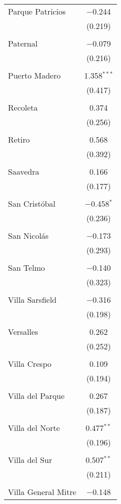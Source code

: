 \begin{table}[!htbp]
\begin{tabular}{@{\extracolsep{5pt}}lc}
 Parque Patricios & $-$0.244 \\ 
  & (0.219) \\ 
  & \\ 
 Paternal & $-$0.079 \\ 
  & (0.216) \\ 
  & \\ 
 Puerto Madero & 1.358$^{***}$ \\ 
  & (0.417) \\ 
  & \\ 
 Recoleta & 0.374 \\ 
  & (0.256) \\ 
  & \\ 
 Retiro & 0.568 \\ 
  & (0.392) \\ 
  & \\ 
 Saavedra & 0.166 \\ 
  & (0.177) \\ 
  & \\ 
 San Cristóbal & $-$0.458$^{*}$ \\ 
  & (0.236) \\ 
  & \\ 
 San Nicolás & $-$0.173 \\ 
  & (0.293) \\ 
  & \\ 
 San Telmo & $-$0.140 \\ 
  & (0.323) \\ 
  & \\ 
 Villa Sarsfield & $-$0.316 \\ 
  & (0.198) \\ 
  & \\ 
 Versalles & 0.262 \\ 
  & (0.252) \\ 
  & \\ 
 Villa Crespo & 0.109 \\ 
  & (0.194) \\ 
  & \\ 
 Villa del Parque & 0.267 \\ 
  & (0.187) \\ 
  & \\ 
 Villa del Norte & 0.477$^{**}$ \\ 
  & (0.196) \\ 
  & \\ 
 Villa del Sur & 0.507$^{**}$ \\ 
  & (0.211) \\ 
  & \\ 
 Villa General Mitre & $-$0.148 \\ 

\end{tabular}
\end{table}
